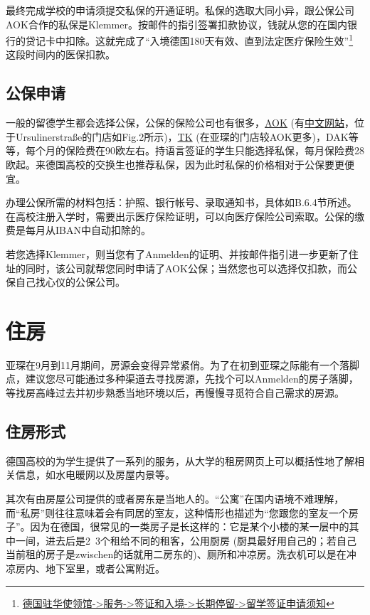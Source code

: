     最终完成学校的申请须提交私保的开通证明。私保的选取大同小异，跟公保公司AOK合作的私保是Klemmer。按邮件的指引签署扣款协议，钱就从您的在国内银行的贷记卡中扣除。这就完成了``入境德国180天有效、直到法定医疗保险生效''\footnote{\href{https://china.diplo.de/blob/1341652/cd1526772cd3d64a3f122f07d908a16b/pdf-merkblatt-natvisum-studium-data.pdf}{德国驻华使领馆->服务->签证和入境->长期停留->留学签证申请须知}} 这段时间内的医保扣款。

  \subsection{公保申请}\label{subsec:公保申请}

    一般的留德学生都会选择公保，公保的保险公司也有很多，\href{https://www.aok.de/}{AOK} (有\href{http://www.aok-cn.com/}{中文网站}，位于Ursulinerstraße的门店如Fig.2所示)，\href{https://www.tk.de/techniker}{TK} (在亚琛的门店较AOK更多)，DAK等等，每个月的保险费在90欧左右。持语言签证的学生只能选择私保，每月保险费28欧起。来德国高校的交换生也推荐私保，因为此时私保的价格相对于公保要更便宜。

    办理公保所需的材料包括：护照、银行帐号、录取通知书，具体如B.6.4节所述。在高校注册入学时，需要出示医疗保险证明，可以向医疗保险公司索取。公保的缴费是每月从IBAN中自动扣除的。

    若您选择Klemmer，则当您有了Anmelden的证明、并按邮件指引进一步更新了住址的同时，该公司就帮您同时申请了AOK公保；当然您也可以选择仅扣款，而公保自己找心仪的公保公司。

\section{住房}

  亚琛在9月到11月期间，房源会变得异常紧俏。为了在初到亚琛之际能有一个落脚点，建议您尽可能通过多种渠道去寻找房源，先找个可以Anmelden的房子落脚，等找房高峰过去并初步熟悉当地环境以后，再慢慢寻觅符合自己需求的房源。

  \subsection{住房形式}\label{subsec:住房形式}

    德国高校的为学生提供了一系列的服务，从大学的租房网页上可以概括性地了解相关信息，如水电暖网以及房屋内景等。

    其次有由房屋公司提供的或者房东是当地人的。``公寓''在国内语境不难理解，而``私房''则往往意味着会有同居的室友，这种情形也描述为``您跟您的室友一个房子''。因为在德国，很常见的一类房子是长这样的：它是某个小楼的某一层中的其中一间，进去后是2~3个租给不同的租客，公用厨房 (厨具最好用自己的；若自己当前租的房子是zwischen的话就用二房东的)、厕所和冲凉房。洗衣机可以是在冲凉房内、地下室里，或者公寓附近。

